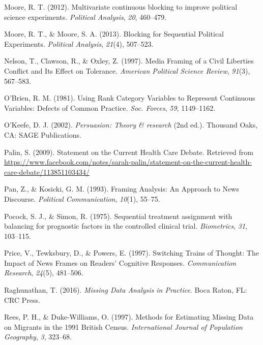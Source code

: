 \documentclass[12pt,econ]{sources/authesis}
\begin{document}
\leavevmode\hypertarget{ref-moore_2012_multivariate}{}%
Moore, R. T. (2012). Multivariate continuous blocking to improve political science experiments. \emph{Political Analysis}, \emph{20}, 460--479.

\leavevmode\hypertarget{ref-moore_blocking_2013}{}%
Moore, R. T., \& Moore, S. A. (2013). Blocking for Sequential Political Experiments. \emph{Political Analysis}, \emph{21}(4), 507--523.

\leavevmode\hypertarget{ref-nelson_media_1997}{}%
Nelson, T., Clawson, R., \& Oxley, Z. (1997). Media Framing of a Civil Liberties Conflict and Its Effect on Tolerance. \emph{American Political Science Review}, \emph{91}(3), 567--583.

\leavevmode\hypertarget{ref-obrien_1981_using}{}%
O'Brien, R. M. (1981). Using Rank Category Variables to Represent Continuous Variables: Defects of Common Practice. \emph{Soc. Forces}, \emph{59}, 1149--1162.

\leavevmode\hypertarget{ref-okeefe_2002_persuasion}{}%
O'Keefe, D. J. (2002). \emph{Persuasion: Theory \& research} (2nd ed.). Thousand Oaks, CA: SAGE Publications.

\leavevmode\hypertarget{ref-palin_statement_2009}{}%
Palin, S. (2009). Statement on the Current Health Care Debate. Retrieved from \url{https://www.facebook.com/notes/sarah-palin/statement-on-the-current-health-care-debate/113851103434/}

\leavevmode\hypertarget{ref-pan_framing_1993}{}%
Pan, Z., \& Kosicki, G. M. (1993). Framing Analysis: An Approach to News Discourse. \emph{Political Communication}, \emph{10}(1), 55--75.

\leavevmode\hypertarget{ref-pocock_1975_sequential}{}%
Pocock, S. J., \& Simon, R. (1975). Sequential treatment assignment with balancing for prognostic factors in the controlled clinical trial. \emph{Biometrics}, \emph{31}, 103--115.

\leavevmode\hypertarget{ref-price_switching_1997}{}%
Price, V., Tewksbury, D., \& Powers, E. (1997). Switching Trains of Thought: The Impact of News Frames on Readers' Cognitive Responses. \emph{Communication Research}, \emph{24}(5), 481--506.

\leavevmode\hypertarget{ref-raghunathan_2016_missing}{}%
Raghunathan, T. (2016). \emph{Missing Data Analysis in Practice}. Boca Raton, FL: CRC Press.

\leavevmode\hypertarget{ref-rees_1997_methods}{}%
Rees, P. H., \& Duke-Williams, O. (1997). Methods for Estimating Missing Data on Migrants in the 1991 British Census. \emph{International Journal of Population Geography}, \emph{3}, 323--68.
\end{document}
